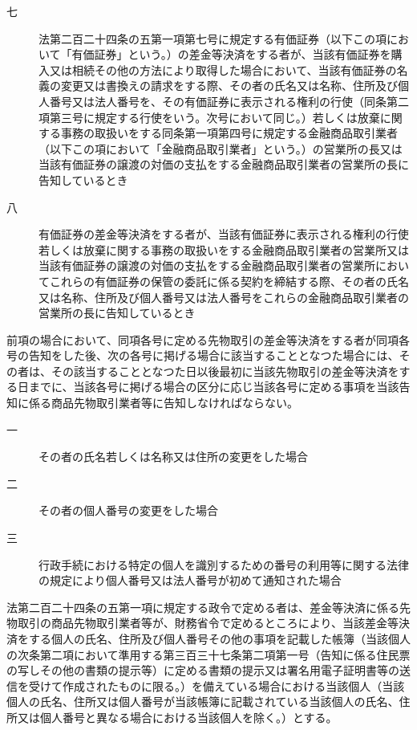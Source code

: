 \documentclass[twocolumn,a4j,10pt]{ltjtarticle}
\begin{document}
\begin{description}
\begin{description}
\item[七]法第二百二十四条の五第一項第七号に規定する有価証券（以下この項において「有価証券」という。）の差金等決済をする者が、当該有価証券を購入又は相続その他の方法により取得した場合において、当該有価証券の名義の変更又は書換えの請求をする際、その者の氏名又は名称、住所及び個人番号又は法人番号を、その有価証券に表示される権利の行使（同条第二項第三号に規定する行使をいう。次号において同じ。）若しくは放棄に関する事務の取扱いをする同条第一項第四号に規定する金融商品取引業者（以下この項において「金融商品取引業者」という。）の営業所の長又は当該有価証券の譲渡の対価の支払をする金融商品取引業者の営業所の長に告知しているとき
\item[八]有価証券の差金等決済をする者が、当該有価証券に表示される権利の行使若しくは放棄に関する事務の取扱いをする金融商品取引業者の営業所又は当該有価証券の譲渡の対価の支払をする金融商品取引業者の営業所においてこれらの有価証券の保管の委託に係る契約を締結する際、その者の氏名又は名称、住所及び個人番号又は法人番号をこれらの金融商品取引業者の営業所の長に告知しているとき
\end{description}
\item[\rensuji{3}]前項の場合において、同項各号に定める先物取引の差金等決済をする者が同項各号の告知をした後、次の各号に掲げる場合に該当することとなつた場合には、その者は、その該当することとなつた日以後最初に当該先物取引の差金等決済をする日までに、当該各号に掲げる場合の区分に応じ当該各号に定める事項を当該告知に係る商品先物取引業者等に告知しなければならない。
\begin{description}
\item[一]その者の氏名若しくは名称又は住所の変更をした場合
\item[二]その者の個人番号の変更をした場合
\item[三]行政手続における特定の個人を識別するための番号の利用等に関する法律の規定により個人番号又は法人番号が初めて通知された場合
\end{description}
\item[\rensuji{4}]法第二百二十四条の五第一項に規定する政令で定める者は、差金等決済に係る先物取引の商品先物取引業者等が、財務省令で定めるところにより、当該差金等決済をする個人の氏名、住所及び個人番号その他の事項を記載した帳簿（当該個人の次条第二項において準用する第三百三十七条第二項第一号（告知に係る住民票の写しその他の書類の提示等）に定める書類の提示又は署名用電子証明書等の送信を受けて作成されたものに限る。）を備えている場合における当該個人（当該個人の氏名、住所又は個人番号が当該帳簿に記載されている当該個人の氏名、住所又は個人番号と異なる場合における当該個人を除く。）とする。
\end{description}
\end{document}
